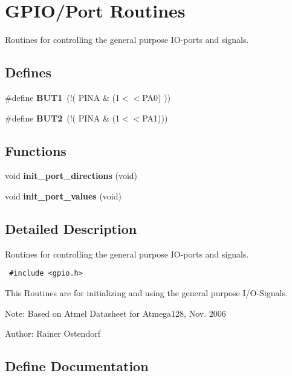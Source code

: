 \section{GPIO/Port Routines}
\label{group__ro__gpio}
Routines for controlling the general purpose IO-ports and signals.  
\subsection*{Defines}
\begin{CompactItemize}
\item 
\#define {\bf BUT1}~(!( PINA \& (1$<$$<$PA0) ))
\item 
\#define {\bf BUT2}~(!( PINA \& (1$<$$<$PA1)))
\end{CompactItemize}
\subsection*{Functions}
\begin{CompactItemize}
\item 
void {\bf init\_\-port\_\-directions} (void)
\item 
void {\bf init\_\-port\_\-values} (void)
\end{CompactItemize}


\subsection{Detailed Description}
Routines for controlling the general purpose IO-ports and signals. 



\begin{Code}\begin{verbatim} #include <gpio.h> 
\end{verbatim}\end{Code}



This Routines are for initializing and using the general purpose I/O-Signals.

\begin{Desc}
\item[Note:]Based on Atmel Datasheet for Atmega128, Nov. 2006 \end{Desc}
\begin{Desc}
\item[Author:]Rainer Ostendorf \end{Desc}


\subsection{Define Documentation}
